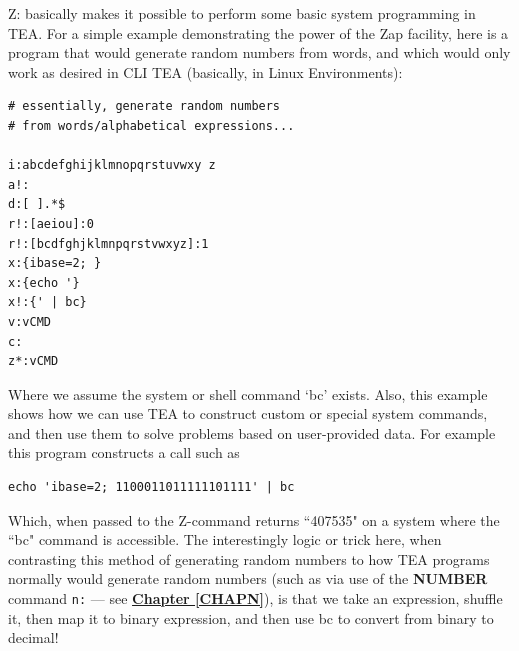 \documentclass[a4paper, 18pt]{book} %
\begin{document}
{{{Z: basically makes it possible to perform some basic system programming in TEA. For a simple example demonstrating the power of the Zap facility, here is a program that would generate random numbers from words, and which would only work as desired in CLI TEA (basically, in Linux Environments):


\vspace{2em}

  \begin{tcolorbox}[teaterminalstyle, title=Z: EXAMPLE 1: Random Numbers from Words, breakable]
  \begin{lstlisting}[language=TEA,breaklines=true,]
# essentially, generate random numbers
# from words/alphabetical expressions...

i:abcdefghijklmnopqrstuvwxy z
a!:
d:[ ].*$
r!:[aeiou]:0
r!:[bcdfghjklmnpqrstvwxyz]:1
x:{ibase=2; }
x:{echo '}
x!:{' | bc}
v:vCMD
c:
z*:vCMD
   \end{lstlisting}
  \end{tcolorbox}

\vspace{2em}

Where we assume the system or shell command `bc' exists. Also, this example shows how we can use TEA to construct custom or special system commands, and then use them to solve problems based on user-provided data. For example this program constructs a call such as

\vspace{2em}

{
\LARGE
  \begin{tcolorbox}[myterminalstyle, title=Dynamically Constructed BC language Command]
  \begin{lstlisting}
echo 'ibase=2; 1100011011111101111' | bc             
  \end{lstlisting}
  \end{tcolorbox}
}

\vspace{2em}

Which, when passed to the Z-command returns ``407535" on a system where the ``bc" command is accessible. The interestingly logic or trick here, when contrasting this method of generating random numbers to how TEA programs normally would generate random numbers (such as via use of the \textbf{NUMBER} command \texttt{n:} --- see \textbf{\hyperref[CHAPN]{Chapter \ref{CHAPN}}}), is that we take an expression, shuffle it, then map it to binary expression, and then use bc to convert from binary to decimal!

}}}
\end{document}
